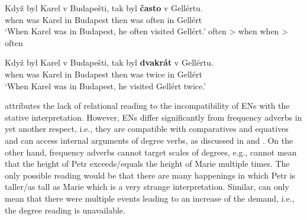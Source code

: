 \documentclass[output=paper,
modfonts,
hidelinks,
newtxmath
]{langscibook}
\begin{document}
\ea\label{casto-(non)relational-reading} \gll Když byl Karel v Budapešti, tak byl \textbf{často} v Gellértu.\\
when was Karel in Budapest then was often in Gellért\\
\glt `When Karel was in Budapest, he often visited Gellért.'
\ea often \textgreater{} when\label{casto-relational-reading}
\ex when \textgreater{} often\label{casto-non-relational-reading}
\z \z

\ea\label{dvakrat-(non)relational-reading} \gll Když byl Karel v Budapešti, tak byl \textbf{dvakrát} v Gellértu.\\
when was Karel in Budapest then was twice in Gellért\\
\glt `When Karel was in Budapest, he visited Gellért twice.'
\z \z

\noindent \cite{doetjes_adverbs_2007} attributes the lack of relational reading to the incompatibility of ENs with the stative interpretation. However, ENs differ significantly from frequency adverbs in yet another respect, i.e., they are compatible with comparatives and equatives and can access internal arguments of degree verbs, as discussed in  and . On the other hand, frequency adverbs cannot target scales of degrees, e.g.,  cannot mean that the height of Petr exceeds/equals the height of Marie multiple times. The only possible reading would be that there are many happenings in which Petr is taller/as tall as Marie which is a very strange interpretation. Similar,  can only mean that there were multiple events leading to an increase of the demand, i.e., the degree reading is unavailable.

\z

\z

\begin{table}[b]
\caption{Scopal properties of adverbs of quantification}\label{table:scale}
{}
\end{table}
\end{document}
